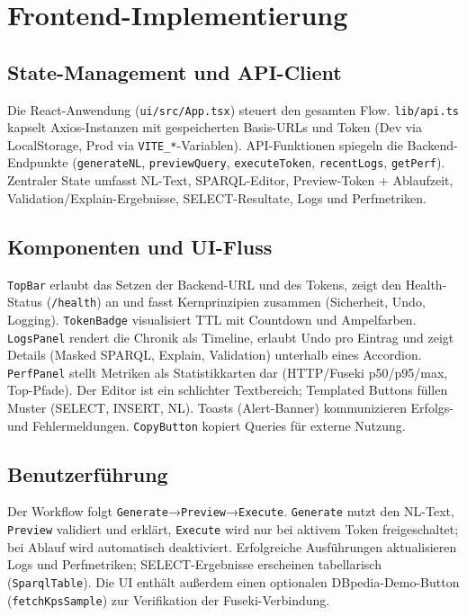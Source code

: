\section{Frontend-Implementierung}

\subsection{State-Management und API-Client}
Die React-Anwendung (\texttt{ui/src/App.tsx}) steuert den gesamten Flow. \texttt{lib/api.ts} kapselt Axios-Instanzen mit gespeicherten Basis-URLs und Token (Dev via LocalStorage, Prod via \texttt{VITE\_*}-Variablen). API-Funktionen spiegeln die Backend-Endpunkte (\texttt{generateNL}, \texttt{previewQuery}, \texttt{executeToken}, \texttt{recentLogs}, \texttt{getPerf}). Zentraler State umfasst NL-Text, SPARQL-Editor, Preview-Token + Ablaufzeit, Validation/Explain-Ergebnisse, SELECT-Resultate, Logs und Perfmetriken.

\subsection{Komponenten und UI-Fluss}
\texttt{TopBar} erlaubt das Setzen der Backend-URL und des Tokens, zeigt den Health-Status (\texttt{/health}) an und fasst Kernprinzipien zusammen (Sicherheit, Undo, Logging). \texttt{TokenBadge} visualisiert TTL mit Countdown und Ampelfarben. \texttt{LogsPanel} rendert die Chronik als Timeline, erlaubt Undo pro Eintrag und zeigt Details (Masked SPARQL, Explain, Validation) unterhalb eines Accordion. \texttt{PerfPanel} stellt Metriken als Statistikkarten dar (HTTP/Fuseki p50/p95/max, Top-Pfade). Der Editor ist ein schlichter Textbereich; Templated Buttons füllen Muster (SELECT, INSERT, NL). Toasts (Alert-Banner) kommunizieren Erfolgs- und Fehlermeldungen. \texttt{CopyButton} kopiert Queries für externe Nutzung.

\subsection{Benutzerführung}
Der Workflow folgt \texttt{Generate}→\texttt{Preview}→\texttt{Execute}. \texttt{Generate} nutzt den NL-Text, \texttt{Preview} validiert und erklärt, \texttt{Execute} wird nur bei aktivem Token freigeschaltet; bei Ablauf wird automatisch deaktiviert. Erfolgreiche Ausführungen aktualisieren Logs und Perfmetriken; SELECT-Ergebnisse erscheinen tabellarisch (\texttt{SparqlTable}). Die UI enthält außerdem einen optionalen DBpedia-Demo-Button (\texttt{fetchKpsSample}) zur Verifikation der Fuseki-Verbindung.

